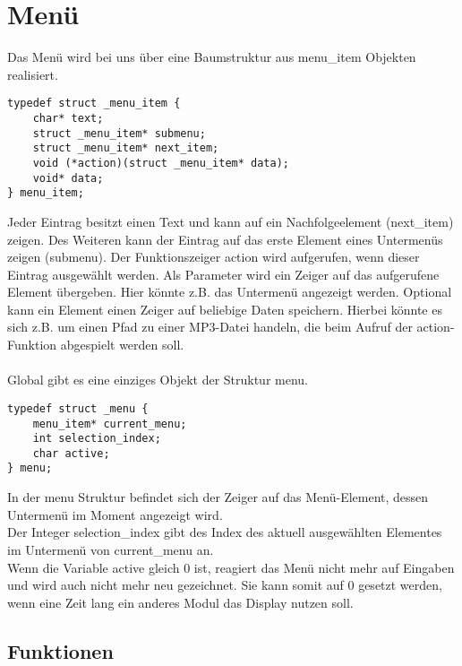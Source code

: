 \section{Menü}

Das Menü wird bei uns über eine Baumstruktur aus menu\_item Objekten realisiert.

\begin{lstlisting}[label=struct_menu_item,caption=menu\_item Struktur]
typedef struct _menu_item {
	char* text;
	struct _menu_item* submenu;
	struct _menu_item* next_item;
	void (*action)(struct _menu_item* data);
	void* data;
} menu_item;
\end{lstlisting}

Jeder Eintrag besitzt einen Text und kann auf ein Nachfolgeelement (next\_item) zeigen. Des Weiteren kann der Eintrag auf das erste Element eines Untermenüs zeigen (submenu). Der Funktionszeiger action wird aufgerufen, wenn dieser Eintrag ausgewählt werden. Als Parameter wird ein Zeiger auf das aufgerufene Element übergeben. Hier könnte z.B. das Untermenü angezeigt werden. Optional kann ein Element einen Zeiger auf beliebige Daten speichern. Hierbei könnte es sich z.B. um einen Pfad zu einer MP3-Datei handeln, die beim Aufruf der action-Funktion abgespielt werden soll.\\
\\
Global gibt es eine einziges Objekt der Struktur menu.

\begin{lstlisting}[label=struct_menu,caption=menu Struktur]
typedef struct _menu {
	menu_item* current_menu;
	int selection_index;
	char active;
} menu;
\end{lstlisting}

In der menu Struktur befindet sich der Zeiger auf das Menü-Element, dessen Untermenü im Moment angezeigt wird.\\
Der Integer selection\_index gibt des Index des aktuell ausgewählten Elementes im Untermenü von current\_menu an.\\
Wenn die Variable active gleich 0 ist, reagiert das Menü nicht mehr auf Eingaben und wird auch nicht mehr neu gezeichnet. Sie kann somit auf 0 gesetzt werden, wenn eine Zeit lang ein anderes Modul das Display nutzen soll.

\subsection{Funktionen}

